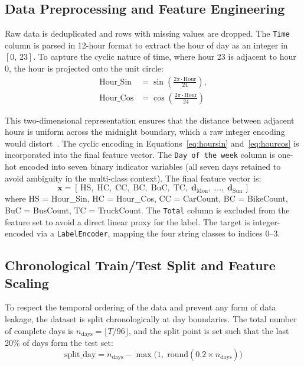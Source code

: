 \documentclass[conference,onecolumn,12pt]{IEEEtran}
\begin{document}
\subsection{Data Preprocessing and Feature Engineering}

Raw data is deduplicated and rows with missing values are dropped. The
\texttt{Time} column is parsed in 12-hour format to extract the hour of day
as an integer in $[0,\,23]$. To capture the cyclic nature of time, where
hour 23 is adjacent to hour 0, the hour is projected onto the unit circle:
\begin{subequations}
\label{eq:cyclic}
\begin{align}
  \text{Hour\_Sin} &= \sin\!\left(\frac{2\pi\cdot\text{Hour}}{24}\right), \label{eq:hoursin}\\
  \text{Hour\_Cos} &= \cos\!\left(\frac{2\pi\cdot\text{Hour}}{24}\right) \label{eq:hourcos}
\end{align}
\end{subequations}

This two-dimensional representation ensures that the distance between adjacent
hours is uniform across the midnight boundary, which a raw integer encoding
would distort~\cite{kashyap2023}. The cyclic encoding in
Equations~\eqref{eq:hoursin} and~\eqref{eq:hourcos} is incorporated into the
final feature vector. The \texttt{Day of the week} column is
one-hot encoded into seven binary indicator variables (all seven days retained
to avoid ambiguity in the multi-class context). The final feature vector is:
\begin{equation}
  \mathbf{x} =
  [\,\text{HS},\;\text{HC},\;\text{CC},\;\text{BC},\;\text{BuC},\;\text{TC},\;
   \mathbf{d}_{\text{Mon}},\;\ldots,\;\mathbf{d}_{\text{Sun}}\,]
  \label{eq:features}
\end{equation}
where HS = Hour\_Sin, HC = Hour\_Cos, CC = CarCount,
BC = BikeCount, BuC = BusCount, TC = TruckCount. The \texttt{Total}
column is excluded from the feature set to avoid a direct linear proxy for the
label. The target is integer-encoded via a \texttt{LabelEncoder}, mapping the
four string classes to indices 0--3.

\subsection{Chronological Train/Test Split and Feature Scaling}

To respect the temporal ordering of the data and prevent any form of data
leakage, the dataset is split chronologically at day boundaries. The total
number of complete days is $n_{\text{days}} = \lfloor T / 96 \rfloor$, and
the split point is set such that the last 20\% of days form the test set:
\begin{equation}
  \text{split\_day}
    = n_{\text{days}} - \max\!\bigl(1,\;\mathrm{round}(0.2\times n_{\text{days}})\bigr)
  \label{eq:split}
\end{equation}
\end{document}
